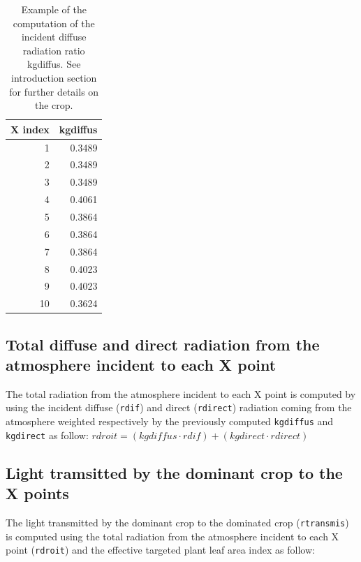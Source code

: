 \documentclass[]{book}
\begin{document}
\begin{table}[t]

\caption{\label{tab:kdifftot}Example of the computation of the incident diffuse radiation ratio kgdiffus. See introduction section for further details on the crop.}
\centering
\begin{tabular}{r|r}
\hline
X index & kgdiffus\\
\hline
1 & 0.3489\\
\hline
2 & 0.3489\\
\hline
3 & 0.3489\\
\hline
4 & 0.4061\\
\hline
5 & 0.3864\\
\hline
6 & 0.3864\\
\hline
7 & 0.3864\\
\hline
8 & 0.4023\\
\hline
9 & 0.4023\\
\hline
10 & 0.3624\\
\hline
\end{tabular}
\end{table}

\hypertarget{total-diffuse-and-direct-radiation-from-the-atmosphere-incident-to-each-x-point}{%
\subsection{Total diffuse and direct radiation from the atmosphere incident to each X point}\label{total-diffuse-and-direct-radiation-from-the-atmosphere-incident-to-each-x-point}}

The total radiation from the atmosphere incident to each X point is computed by using the incident diffuse (\texttt{rdif}) and direct (\texttt{rdirect}) radiation coming from the atmosphere weighted respectively by the previously computed \texttt{kgdiffus} and \texttt{kgdirect} as follow:
\(rdroit=(kgdiffus\cdot rdif)+(kgdirect\cdot rdirect)\)

\hypertarget{light-tramsitted-by-the-dominant-crop-to-the-x-points}{%
\subsection{Light tramsitted by the dominant crop to the X points}\label{light-tramsitted-by-the-dominant-crop-to-the-x-points}}

The light transmitted by the dominant crop to the dominated crop (\texttt{rtransmis}) is computed using the total radiation from the atmosphere incident to each X point (\texttt{rdroit}) and the effective targeted plant leaf area index as follow:
\end{document}
